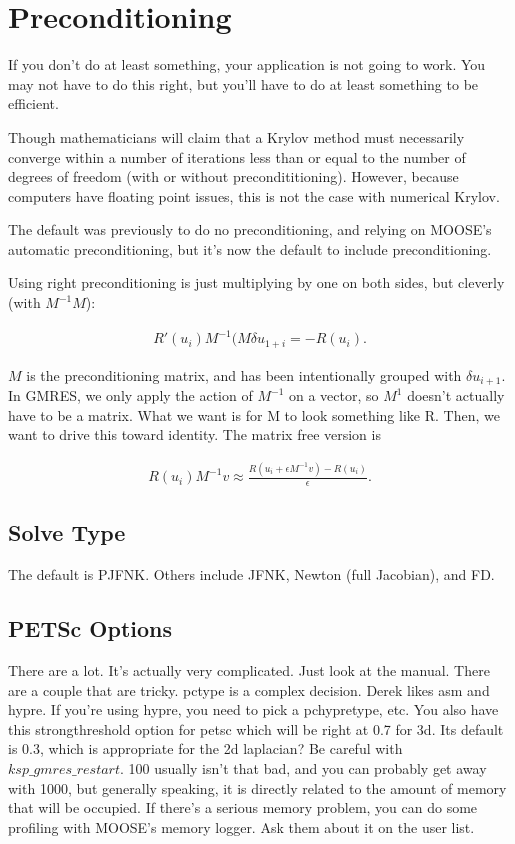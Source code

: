 \section{Preconditioning}
If you don't do at least something, your application is not going to work. You 
may not have to do this right, but you'll have to do at least something to be 
efficient. 

Though mathematicians will claim that a Krylov method must necessarily converge 
within a number of iterations less than or equal to the number of degrees of 
freedom (with or without precondititioning). However, because computers have 
floating point issues, this is not the case with numerical Krylov.

The default was previously to do no preconditioning, and relying on MOOSE's 
automatic preconditioning, but it's now the default to include preconditioning.

Using right preconditioning is just multiplying by one on both sides, but 
cleverly (with $M^{-1}M$):

\begin{align}
  R'(u_i)M^{-1}(M\delta u_{1+i}=-R(u_i).
  \label{right_precon}
\end{align}

$M$ is the preconditioning matrix, and has been intentionally grouped with 
$\delta u_{i+1}$. In GMRES, we only apply the action of $M^{-1}$ on a vector, so 
$M^{1}$ doesn't actually have to be a matrix.  What we want is for M to look 
something like R. Then, we want to drive this toward identity. The matrix free 
version is 

\begin{align}
  R(u_i)M^{-1}v\approx \frac{R(u_i+\epsilon M^{-1} v)-R(u_i)}{\epsilon}.
  \label{matrixfreeprecon}
\end{align}

\subsection{Solve Type}
The default is PJFNK. Others include JFNK, Newton (full Jacobian), and FD.

\subsection{PETSc Options}
There are a lot. It's actually very complicated. Just look at the manual. There 
are a couple that are tricky. pctype is a complex decision. Derek likes asm and 
hypre. If you're using hypre, you need to pick a pchypretype, etc.  You also 
have this strongthreshold option for petsc which will be right at 0.7 for 3d. 
Its default is 0.3, which is appropriate for the 2d laplacian?  Be careful with 
$ksp\_gmres\_restart$. 100 usually isn't that bad, and you can probably get away 
with 1000, but generally speaking, it is directly related to the amount of 
memory that will be occupied. If there's a serious memory problem, you can do 
some profiling with  MOOSE's memory logger. Ask them about it on the user list. 


